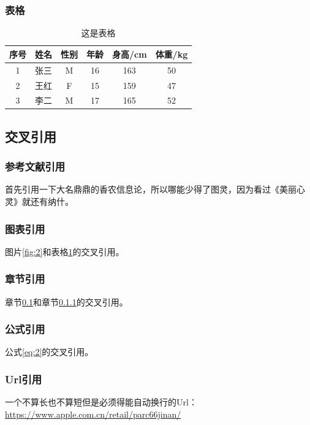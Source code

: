 \begin{ujnbody}
    \subsubsection{表格}
    \begin{table}[!htbp]
        \centering
        \caption{这是表格}
        \begin{tabular}{cccccc}
            \toprule
            序号 & 姓名 & 性别 & 年龄 & 身高/cm & 体重/kg \\
            \midrule
            1 & 张三 & M & 16 & 163 & 50 \\
            2 & 王红 & F & 15 & 159 & 47 \\
            3 & 李二 & M & 17 & 165 & 52 \\
            \bottomrule
        \end{tabular}
        \label{tab:2}
    \end{table}
    \subsection{交叉引用}\label{sec:3}
    \subsubsection{参考文献引用}\label{sec:4}
    首先引用一下大名鼎鼎的香农信息论\cite{shannon1948mathematical}，所以哪能少得了图灵\cite{turing2009computing}，因为看过《美丽心灵》就还有纳什\cite{nash1996non}。
    \subsubsection{图表引用}
    图片\ref{fig:2}和表格\ref{tab:2}的交叉引用。
    \subsubsection{章节引用}
    章节\ref{sec:3}和章节\ref{sec:4}的交叉引用。
    \subsubsection{公式引用}
    公式\ref{eq:2}的交叉引用。
    \subsubsection{Url引用}
    一个不算长也不算短但是必须得能自动换行的Url：\url{https://www.apple.com.cn/retail/parc66jinan/}
\end{ujnbody}